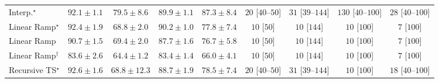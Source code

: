 \begin{tabular}{l|cccc|cccc|}
Interp.$^\star$ & {\cellcolor[HTML]{712806}} \color[HTML]{F1F1F1} $92.1\pm 1.1$ & {\cellcolor[HTML]{DF620D}} \color[HTML]{F1F1F1} $79.5\pm 8.6$ & {\cellcolor[HTML]{882F05}} \color[HTML]{F1F1F1} $89.9\pm 1.1$ & {\cellcolor[HTML]{A03704}} \color[HTML]{F1F1F1} $87.3\pm 8.4$ & {\cellcolor[HTML]{FFF4F0}} \color[HTML]{000000} $20$ [$40$--$50$] & {\cellcolor[HTML]{FFF2EE}} \color[HTML]{000000} $31$ [$39$--$144$] & {\cellcolor[HTML]{FDDBD7}} \color[HTML]{000000} $130$ [$40$--$100$] & {\cellcolor[HTML]{FFF3EF}} \color[HTML]{000000} $28$ [$40$--$100$] \\
Linear Ramp$^\star$ & {\cellcolor[HTML]{702806}} \color[HTML]{F1F1F1} $92.4\pm 1.9$ & {\cellcolor[HTML]{FEB541}} \color[HTML]{000000} $68.8\pm 2.0$ & {\cellcolor[HTML]{842E05}} \color[HTML]{F1F1F1} $90.2\pm 1.0$ & {\cellcolor[HTML]{EA6E13}} \color[HTML]{F1F1F1} $77.8\pm 7.4$ & {\cellcolor[HTML]{FFF7F3}} \color[HTML]{000000} $10$ [$50$] & {\cellcolor[HTML]{FFF7F3}} \color[HTML]{000000} $10$ [$144$] & {\cellcolor[HTML]{FFF7F3}} \color[HTML]{000000} $10$ [$100$] & {\cellcolor[HTML]{FFF7F3}} \color[HTML]{000000} $7$ [$100$] \\
Linear Ramp & {\cellcolor[HTML]{802D05}} \color[HTML]{F1F1F1} $90.7\pm 1.5$ & {\cellcolor[HTML]{FEAF3D}} \color[HTML]{000000} $69.4\pm 2.0$ & {\cellcolor[HTML]{9C3604}} \color[HTML]{F1F1F1} $87.7\pm 1.6$ & {\cellcolor[HTML]{EE7617}} \color[HTML]{F1F1F1} $76.7\pm 5.8$ & {\cellcolor[HTML]{FFF7F3}} \color[HTML]{000000} $10$ [$50$] & {\cellcolor[HTML]{FFF7F3}} \color[HTML]{000000} $10$ [$144$] & {\cellcolor[HTML]{FFF7F3}} \color[HTML]{000000} $10$ [$100$] & {\cellcolor[HTML]{FFF7F3}} \color[HTML]{000000} $7$ [$100$] \\
Linear Ramp$^\dagger$ & {\cellcolor[HTML]{C44802}} \color[HTML]{F1F1F1} $83.6\pm 2.6$ & {\cellcolor[HTML]{FED36F}} \color[HTML]{000000} $64.4\pm 1.2$ & {\cellcolor[HTML]{C64902}} \color[HTML]{F1F1F1} $83.4\pm 1.4$ & {\cellcolor[HTML]{FEC95B}} \color[HTML]{000000} $66.0\pm 4.1$ & {\cellcolor[HTML]{FFF7F3}} \color[HTML]{000000} $10$ [$50$] & {\cellcolor[HTML]{FFF7F3}} \color[HTML]{000000} $10$ [$144$] & {\cellcolor[HTML]{FFF7F3}} \color[HTML]{000000} $10$ [$100$] & {\cellcolor[HTML]{FFF7F3}} \color[HTML]{000000} $7$ [$100$] \\
Recursive TS$^\star$ & {\cellcolor[HTML]{6C2706}} \color[HTML]{F1F1F1} $92.6\pm 1.6$ & {\cellcolor[HTML]{FEB541}} \color[HTML]{000000} $68.8\pm 12.3$ & {\cellcolor[HTML]{933204}} \color[HTML]{F1F1F1} $88.7\pm 1.9$ & {\cellcolor[HTML]{E56910}} \color[HTML]{F1F1F1} $78.5\pm 7.4$ & {\cellcolor[HTML]{FFF4F0}} \color[HTML]{000000} $20$ [$40$--$50$] & {\cellcolor[HTML]{FFF2EE}} \color[HTML]{000000} $31$ [$39$--$144$] & {\cellcolor[HTML]{FFF7F3}} \color[HTML]{000000} $10$ [$100$] & {\cellcolor[HTML]{FFF5F1}} \color[HTML]{000000} $18$ [$40$--$100$] \\

\end{tabular}
